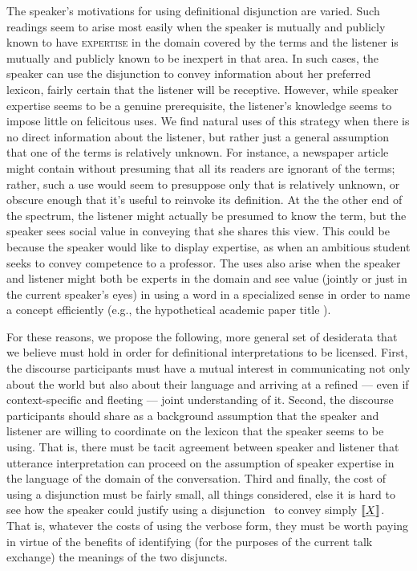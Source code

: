 \documentclass[12pt,twoside]{article}
\renewcommand{\_}{\textbf{\textunderscore\hspace{-4pt}\textunderscore\hspace{-3pt}\textunderscore\hspace{-4pt}\textunderscore}\hspace{0.5pt}}			%
\newcommand{\technicalTerm}[1]{\textsc{#1}}
\begin{document}
The speaker's motivations for using definitional disjunction are
varied. Such readings seem to arise most easily when the speaker is
mutually and publicly known to have \technicalTerm{expertise} in the
domain covered by the terms and the listener is mutually and publicly
known to be inexpert in that area. In such cases, the speaker can use
the disjunction to convey information about her preferred lexicon,
fairly certain that the listener will be receptive. However, while
speaker expertise seems to be a genuine prerequisite, the listener's
knowledge seems to impose little on felicitous uses. We find natural
uses of this strategy when there is no direct information about the
listener, but rather just a general assumption that one of the terms
is relatively unknown. For instance, a newspaper article might contain
 without presuming that all its readers
are ignorant of the terms; rather, such a use would seem to presuppose
only that  is relatively unknown, or obscure enough
that it's useful to reinvoke its definition. At the the other end of
the spectrum, the listener might actually be presumed to know the
term, but the speaker sees social value in conveying that she shares
this view. This could be because the speaker would like to display
expertise, as when an ambitious student seeks to convey competence to
a professor. The uses also arise when the speaker and listener might
both be experts in the domain and see value (jointly or just in the
current speaker's eyes) in using a word in a specialized sense in
order to name a concept efficiently (e.g., the hypothetical academic
paper title ).

For these reasons, we propose the following, more general set of
desiderata that we believe must hold in order for definitional
interpretations to be licensed.  First, the discourse participants
must have a mutual interest in communicating not only about the world
but also about their language and arriving at a refined --- even if
context-specific and fleeting --- joint understanding of it. Second,
the discourse participants should share as a background assumption
that the speaker and listener are willing to coordinate on the lexicon
that the speaker seems to be using.  That is, there must be tacit
agreement between speaker and listener that utterance interpretation
can proceed on the assumption of speaker expertise in the language of
the domain of the conversation.  Third and finally, the cost of using
a disjunction must be fairly small, all things considered, else it is
hard to see how the speaker could justify using a disjunction \XorY\
to convey simply $\llbracket\emph{X\/}\rrbracket$.  That is, whatever the costs of
using the verbose form, they must be worth paying in virtue of the
benefits of identifying (for the purposes of the current talk
exchange) the meanings of the two disjuncts.
\end{document}
